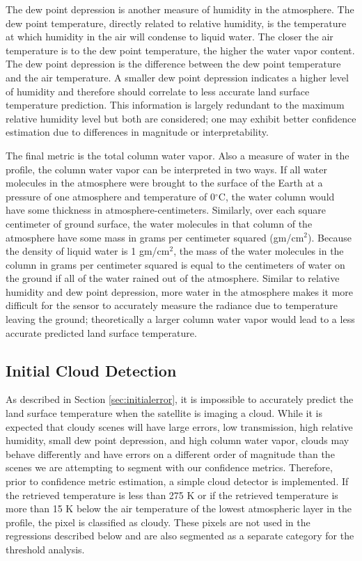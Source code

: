 \documentclass{book}
\begin{document}
The dew point depression is another measure of humidity in the atmosphere.  The dew point temperature, directly related to relative humidity, is the temperature at which humidity in the air will condense to liquid water.  The closer the air temperature is to the dew point temperature, the higher the water vapor content.  The dew point depression is the difference between the dew point temperature and the air temperature.  A smaller dew point depression indicates a higher level of humidity and therefore should correlate to less accurate land surface temperature prediction.  This information is largely redundant to the maximum relative humidity level but both are considered; one may exhibit better confidence estimation due to differences in magnitude or interpretability.

The final metric is the total column water vapor.  Also a measure of water in the profile, the column water vapor can be interpreted in two ways.  If all water molecules in the atmosphere were brought to the surface of the Earth at a pressure of one atmosphere and temperature of 0$^\circ$C, the water column would have some thickness in atmosphere-centimeters.  Similarly, over each square centimeter of ground surface, the water molecules in that column of the atmosphere have some mass in grams per centimeter squared (gm/cm$^2$).  Because the density of liquid water is 1 gm/cm$^2$, the mass of the water molecules in the column in grams per centimeter squared is equal to the centimeters of water on the ground if all of the water rained out of the atmosphere.  Similar to relative humidity and dew point depression, more water in the atmosphere makes it more difficult for the sensor to accurately measure the radiance due to temperature leaving the ground; theoretically a larger column water vapor would lead to a less accurate predicted land surface temperature.  

\subsection{Initial Cloud Detection}
\label{sec:clouddetection}

As described in Section \ref{sec:initialerror}, it is impossible to accurately predict the land surface temperature when the satellite is imaging a cloud.  While it is expected that cloudy scenes will have large errors, low transmission, high relative humidity, small dew point depression, and high column water vapor, clouds may behave differently and have errors on a different order of magnitude than the scenes we are attempting to segment with our confidence metrics.  Therefore, prior to confidence metric estimation, a simple cloud detector is implemented.  If the retrieved temperature is less than 275 K or if the retrieved temperature is more than 15 K below the air temperature of the lowest atmospheric layer in the profile, the pixel is classified as cloudy.  These pixels are not used in the regressions described below and are also segmented as a separate category for the threshold analysis.
\end{document}
